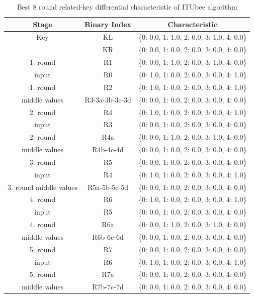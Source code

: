 \begin{table}[H]
    \centering
    \caption{Best 8 round related-key differential characteristic of ITUbee algorithm}
    \begin{tabular}{|c|c|c|}
        \hhline{|=|=|=|}
        \textbf{Stage} & \textbf{Binary Index} & \textbf{Characteristic} \\
        \hline
        Key  & KL & \{0: 0.0, 1: 1.0, 2: 0.0, 3: 1.0, 4: 0.0\} \\
                     & KR & \{0: 0.0, 1: 0.0, 2: 0.0, 3: 0.0, 4: 0.0\} \\
        \hline
        1. round  & R1 & \{0: 0.0, 1: 1.0, 2: 0.0, 3: 1.0, 4: 0.0\} \\
        input     & R0 & \{0: 1.0, 1: 0.0, 2: 0.0, 3: 0.0, 4: 1.0\} \\
        \hline
        1. round  & R2 & \{0: 1.0, 1: 0.0, 2: 0.0, 3: 0.0, 4: 1.0\} \\
        middle values & R3-3a-3b-3c-3d & \{0: 0.0, 1: 0.0, 2: 0.0, 3: 0.0, 4: 0.0\} \\     
        \hline
        2. round  & R4 & \{0: 1.0, 1: 0.0, 2: 0.0, 3: 0.0, 4: 1.0\} \\
        input     & R3 & \{0: 0.0, 1: 0.0, 2: 0.0, 3: 0.0, 4: 0.0\} \\
        \hline
        2. round  & R4a & \{0: 0.0, 1: 1.0, 2: 0.0, 3: 1.0, 4: 0.0\} \\
        middle values & R4b-4c-4d & \{0: 0.0, 1: 0.0, 2: 0.0, 3: 0.0, 4: 0.0\} \\
                      
        \hline
        3. round  & R5 & \{0: 0.0, 1: 0.0, 2: 0.0, 3: 0.0, 4: 0.0\} \\
        input     & R4 & \{0: 1.0, 1: 0.0, 2: 0.0, 3: 0.0, 4: 1.0\} \\
        \hline
        3. round middle values     & R5a-5b-5c-5d & \{0: 0.0, 1: 0.0, 2: 0.0, 3: 0.0, 4: 0.0\} \\
        \hline
        4. round  & R6 & \{0: 1.0, 1: 0.0, 2: 0.0, 3: 0.0, 4: 1.0\} \\
        input     & R5 & \{0: 0.0, 1: 0.0, 2: 0.0, 3: 0.0, 4: 0.0\} \\
        \hline
        4. round  & R6a & \{0: 0.0, 1: 1.0, 2: 0.0, 3: 1.0, 4: 0.0\} \\
        middle values & R6b-6c-6d & \{0: 0.0, 1: 0.0, 2: 0.0, 3: 0.0, 4: 0.0\} \\
                              \hline
        5. round  & R7 & \{0: 0.0, 1: 0.0, 2: 0.0, 3: 0.0, 4: 0.0\} \\
        input     & R6 & \{0: 1.0, 1: 0.0, 2: 0.0, 3: 0.0, 4: 1.0\} \\
        \hline
        5. round  & R7a & \{0: 0.0, 1: 0.0, 2: 0.0, 3: 0.0, 4: 0.0\} \\
        middle values & R7b-7c-7d & \{0: 0.0, 1: 0.0, 2: 0.0, 3: 0.0, 4: 0.0\} \\
                      

\end{tabular}
\end{table}
